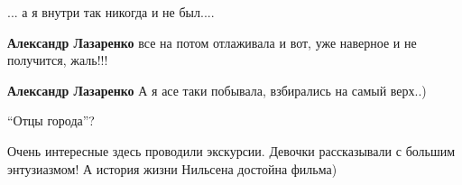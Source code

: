  
 
 
 
 

\qqSecCmt


... а я внутри так никогда и не был....

\begin{itemize} %
\textbf{Александр Лазаренко} все на потом отлаживала и вот, уже наверное и не получится, жаль!!!

\textbf{Александр Лазаренко} А я асе таки побывала, взбирались на самый верх..)
\end{itemize} %


\enquote{Отцы города}?


Очень интересные здесь проводили экскурсии. Девочки рассказывали с большим
энтузиазмом! А история жизни Нильсена достойна фильма)
